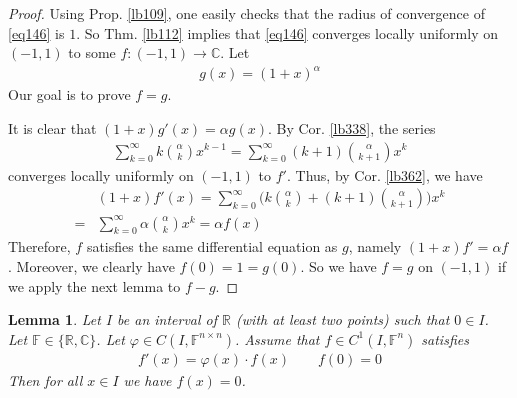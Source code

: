 \documentclass[12pt,b5paper,notitlepage]{article}
\theoremstyle{definition}
\theoremstyle{plain}
\newtheorem{lm}[df]{Lemma}
\newcommand{\Cbb}{\mathbb C}
\newcommand{\Rbb}{\mathbb R}
\newcommand{\Fbb}{\mathbb F}
\numberwithin{equation}{section}
\begin{document}
\begin{proof}
Using Prop. \ref{lb109}, one easily checks that the radius of convergence of \eqref{eq146} is $1$. So Thm. \ref{lb112} implies that \eqref{eq146} converges locally uniformly on $(-1,1)$ to some $f:(-1,1)\rightarrow\Cbb$. Let
\begin{align*}
g(x)=(1+x)^\alpha
\end{align*}
Our goal is to prove $f=g$. 

It is clear that $(1+x)g'(x)=\alpha g(x)$. By Cor. \ref{lb338},  the series
\begin{align}
\sum_{k=0}^\infty k{\alpha\choose k}x^{k-1}=\sum_{k=0}^\infty (k+1){\alpha\choose k+1}x^k
\end{align}
converges locally uniformly on $(-1,1)$ to $f'$. Thus, by Cor. \ref{lb362}, we have
\begin{align*}
&(1+x)f'(x)=\sum_{k=0}^\infty \bigg( k{\alpha\choose k}+(k+1){\alpha\choose k+1}\bigg)x^k\\
=&\sum_{k=0}^\infty \alpha{\alpha\choose k}x^k=\alpha f(x)
\end{align*}
Therefore, $f$ satisfies the same differential equation as $g$, namely $(1+x)f'=\alpha f$. Moreover, we clearly have $f(0)=1=g(0)$. So we have $f=g$ on $(-1,1)$ if we apply the next lemma to $f-g$.
\end{proof}


\begin{lm}\label{lb553}
Let $I$ be an interval of $\Rbb$ (with at least two points) such that $0\in I$. Let $\Fbb\in\{\Rbb,\Cbb\}$. Let $\varphi\in C(I,\Fbb^{n\times n})$. Assume that $f\in C^1(I,\Fbb^n)$ satisfies
\begin{align}
f'(x)=\varphi(x)\cdot f(x)\qquad f(0)=0
\end{align} 
Then for all $x\in I$ we have $f(x)=0$.
\end{lm}
\end{document}
